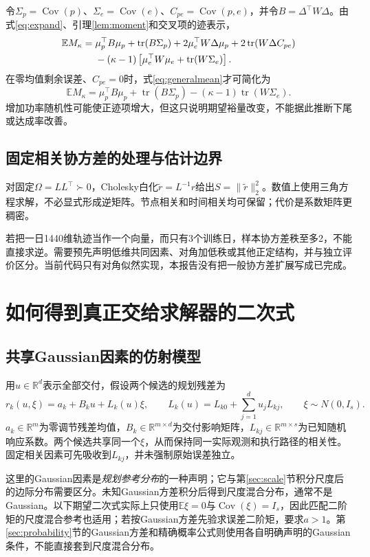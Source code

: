 \documentclass[UTF8,11pt,a4paper,fontset=fandol]{ctexart}
\newcommand{\E}{\mathbb E}
\newcommand{\Cov}{\operatorname{Cov}}
\newcommand{\tr}{\operatorname{tr}}
\newcommand{\R}{\mathbb R}
\numberwithin{equation}{section}
\begin{document}
令$\Sigma_p=\Cov(p)$、$\Sigma_e=\Cov(e)$、$C_{pe}=\Cov(p,e)$，并令$B=\Delta^\top W\Delta$。由式\eqref{eq:expand}、引理\ref{lem:moment}和交叉项的迹表示，
\begin{align}
\E M_\kappa
={}&\mu_p^\top B\mu_p+\tr(B\Sigma_p)
+2\mu_e^\top W\Delta\mu_p
+2\tr(W\Delta C_{pe})\notag\\
&-(\kappa-1)
\left[\mu_e^\top W\mu_e+\tr(W\Sigma_e)\right].
\label{eq:generalmean}
\end{align}
在零均值剩余误差、$C_{pe}=0$时，式\eqref{eq:generalmean}才可简化为
\begin{equation}
\boxed{\E M_\kappa
=\mu_p^\top B\mu_p+\tr(B\Sigma_p)
-(\kappa-1)\tr(W\Sigma_e).}
\label{eq:simplemean}
\end{equation}
增加功率随机性可能使正迹项增大，但这只说明期望裕量改变，不能据此推断下尾或达成率改善。

\subsection{固定相关协方差的处理与估计边界}
对固定$\Omega=LL^\top\succ0$，Cholesky白化$\widetilde r=L^{-1}r$给出$S=\|\widetilde r\|_2^2$。数值上使用三角方程求解，不必显式形成逆矩阵。节点相关和时间相关均可保留；代价是系数矩阵更稠密。

若把一日1440维轨迹当作一个向量，而只有3个训练日，样本协方差秩至多2，不能直接求逆。需要预先声明低维共同因素、对角加低秩或其他正定结构，并与独立评价区分。当前代码只有对角似然实现，本报告没有把一般协方差扩展写成已完成。

\section{如何得到真正交给求解器的二次式}
\label{sec:quadratic}
\subsection{共享Gaussian因素的仿射模型}
用$u\in\R^d$表示全部交付，假设两个候选的规划残差为
\begin{equation}
r_k(u,\xi)=a_k+B_ku+L_k(u)\xi,\qquad
L_k(u)=L_{k0}+\sum_{j=1}^d u_jL_{kj},\qquad
\xi\sim N(0,I_s).
\label{eq:affinefactor}
\end{equation}
$a_k\in\R^m$为零调节残差均值，$B_k\in\R^{m\times d}$为交付影响矩阵，$L_{kj}\in\R^{m\times s}$为已知随机响应系数。两个候选共享同一个$\xi$，从而保持同一实际观测和执行路径的相关性。固定相关因素可先吸收到$L_{kj}$，并未强制原始误差独立。

这里的Gaussian因素是\emph{规划参考分布}的一种声明；它与第\ref{sec:scale}节积分尺度后的边际分布需要区分。未知Gaussian方差积分后得到尺度混合分布，通常不是Gaussian。以下期望二次式实际上只使用$\E\xi=0$与$\Cov(\xi)=I_s$，因此匹配二阶矩的尺度混合参考也适用；若按Gaussian方差先验求误差二阶矩，要求$a>1$。第\ref{sec:probability}节的Gaussian方差和精确概率公式则使用各自明确声明的Gaussian条件，不能直接套到尺度混合分布。
\end{document}
